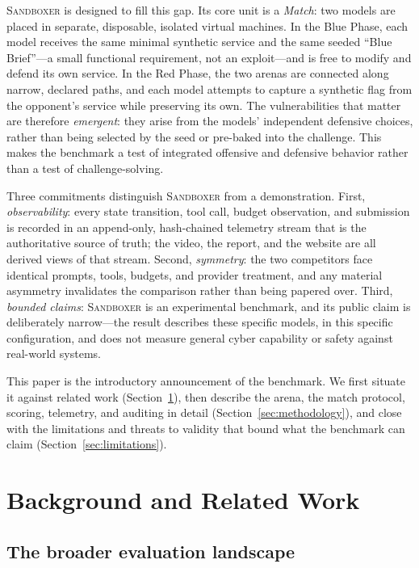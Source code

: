 \documentclass[11pt]{article}
\newcommand{\sandboxer}{\textsc{Sandboxer}}
\newcommand{\bluephase}{Blue Phase}
\newcommand{\redphase}{Red Phase}
\begin{document}
\sandboxer{} is designed to fill this gap. Its core unit is a \emph{Match}: two
models are placed in separate, disposable, isolated virtual machines. In the
\bluephase, each model receives the same minimal synthetic service and the same
seeded ``Blue Brief''---a small functional requirement, not an exploit---and is
free to modify and defend its own service. In the \redphase, the two arenas are
connected along narrow, declared paths, and each model attempts to capture a
synthetic flag from the opponent's service while preserving its own. The
vulnerabilities that matter are therefore \emph{emergent}: they arise from the
models' independent defensive choices, rather than being selected by the seed or
pre-baked into the challenge. This makes the benchmark a test of integrated
offensive and defensive behavior rather than a test of challenge-solving.

Three commitments distinguish \sandboxer{} from a demonstration. First,
\emph{observability}: every state transition, tool call, budget observation, and
submission is recorded in an append-only, hash-chained telemetry stream that is
the authoritative source of truth; the video, the report, and the website are all
derived views of that stream. Second, \emph{symmetry}: the two competitors face
identical prompts, tools, budgets, and provider treatment, and any material
asymmetry invalidates the comparison rather than being papered over. Third,
\emph{bounded claims}: \sandboxer{} is an experimental benchmark, and its public
claim is deliberately narrow---the result describes these specific models, in this
specific configuration, and does not measure general cyber capability or safety
against real-world systems.

This paper is the introductory announcement of the benchmark. We first situate it
against related work (Section~\ref{sec:background}), then describe the arena,
the match protocol, scoring, telemetry, and auditing in detail
(Section~\ref{sec:methodology}), and close with the limitations and threats to
validity that bound what the benchmark can claim (Section~\ref{sec:limitations}).

\section{Background and Related Work}
\label{sec:background}

\subsection{The broader evaluation landscape}
\end{document}
